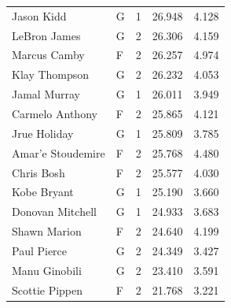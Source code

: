 \begin{table}[t]
\begin{tabular*}{\linewidth}{@{\extracolsep{\fill}}llcrr}
Jason Kidd & G & 1 & 26.948 & 4.128 \\ 
LeBron James & G & 2 & 26.306 & 4.159 \\ 
Marcus Camby & F & 2 & 26.257 & 4.974 \\ 
Klay Thompson & G & 2 & 26.232 & 4.053 \\ 
Jamal Murray & G & 1 & 26.011 & 3.949 \\ 
Carmelo Anthony & F & 2 & 25.865 & 4.121 \\ 
Jrue Holiday & G & 1 & 25.809 & 3.785 \\ 
Amar'e Stoudemire & F & 2 & 25.768 & 4.480 \\ 
Chris Bosh & F & 2 & 25.577 & 4.030 \\ 
Kobe Bryant & G & 1 & 25.190 & 3.660 \\ 
Donovan Mitchell & G & 1 & 24.933 & 3.683 \\ 
Shawn Marion & F & 2 & 24.640 & 4.199 \\ 
Paul Pierce & G & 2 & 24.349 & 3.427 \\ 
Manu Ginobili & G & 2 & 23.410 & 3.591 \\ 
Scottie Pippen & F & 2 & 21.768 & 3.221 \\ 
\bottomrule
\end{tabular*}
\end{table}

